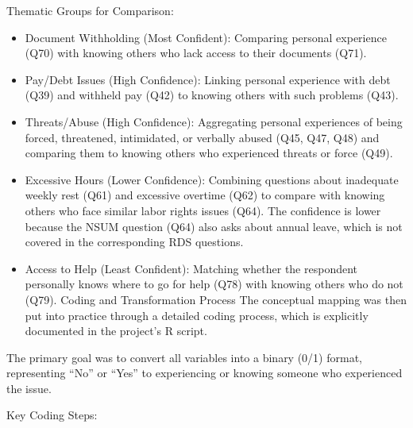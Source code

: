 \documentclass[
  12pt,
  letterpaper,
  DIV=11,
  numbers=noendperiod]{scrartcl}
\providecommand{\tightlist}{%
  \setlength{\itemsep}{0pt}\setlength{\parskip}{0pt}}
\theoremstyle{plain}
\theoremstyle{definition}
\begin{document}
Thematic Groups for Comparison:

\begin{itemize}
\tightlist
\item
  Document Withholding (Most Confident): Comparing personal experience
  (Q70) with knowing others who lack access to their documents (Q71).
\item
  Pay/Debt Issues (High Confidence): Linking personal experience with
  debt (Q39) and withheld pay (Q42) to knowing others with such problems
  (Q43).
\item
  Threats/Abuse (High Confidence): Aggregating personal experiences of
  being forced, threatened, intimidated, or verbally abused (Q45, Q47,
  Q48) and comparing them to knowing others who experienced threats or
  force (Q49).
\item
  Excessive Hours (Lower Confidence): Combining questions about
  inadequate weekly rest (Q61) and excessive overtime (Q62) to compare
  with knowing others who face similar labor rights issues (Q64). The
  confidence is lower because the NSUM question (Q64) also asks about
  annual leave, which is not covered in the corresponding RDS questions.
\item
  Access to Help (Least Confident): Matching whether the respondent
  personally knows where to go for help (Q78) with knowing others who do
  not (Q79). Coding and Transformation Process The conceptual mapping
  was then put into practice through a detailed coding process, which is
  explicitly documented in the project's R script.
\end{itemize}

The primary goal was to convert all variables into a binary (0/1)
format, representing ``No'' or ``Yes'' to experiencing or knowing
someone who experienced the issue.

Key Coding Steps:
\end{document}
